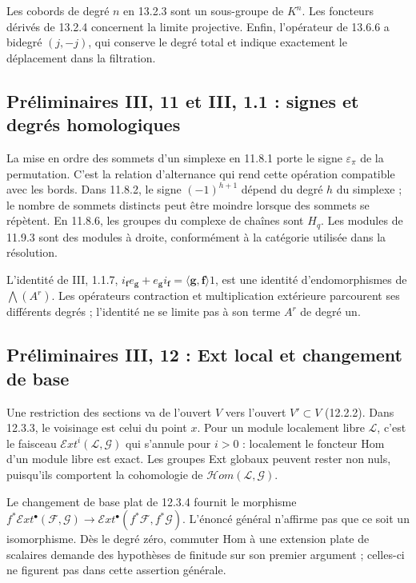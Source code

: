 \documentclass[11pt,a4paper]{article}
\begin{document}
Les cobords de degré $n$ en 13.2.3 sont un sous-groupe de
$K^n$. Les foncteurs dérivés de 13.2.4 concernent la limite
projective. Enfin, l'opérateur de 13.6.6 a bidegré $(j,-j)$,
qui conserve le degré total et indique exactement le déplacement
dans la filtration.

\subsection{Préliminaires III, 11 et III, 1.1 : signes et degrés homologiques}
\label{note:base3-signs}
La mise en ordre des sommets d'un simplexe en 11.8.1 porte le
signe $\varepsilon_\pi$ de la permutation. C'est la relation
d'alternance qui rend cette opération compatible avec les bords.
Dans 11.8.2, le signe $(-1)^{h+1}$ dépend du degré $h$ du
simplexe ; le nombre de sommets distincts peut être moindre
lorsque des sommets se répètent. En 11.8.6, les groupes du
complexe de chaînes sont $H_q$. Les modules de 11.9.3 sont
des modules à droite, conformément à la catégorie utilisée
dans la résolution.

L'identité de III, 1.1.7,
$i_{\mathbf f}e_{\mathbf g}+e_{\mathbf g}i_{\mathbf f}
=\langle\mathbf g,\mathbf f\rangle1$, est une identité
d'endomorphismes de $\bigwedge(A^r)$. Les opérateurs contraction
et multiplication extérieure parcourent ses différents degrés ;
l'identité ne se limite pas à son terme $A^r$ de degré un.

\subsection{Préliminaires III, 12 : Ext local et changement de base}
\label{note:base3-ext}
Une restriction des sections va de l'ouvert $V$ vers l'ouvert
$V'\subset V$ (12.2.2). Dans 12.3.3, le voisinage est celui du
point $x$. Pour un module localement libre $\mathcal L$, c'est
le faisceau $\mathcal E\!xt^i(\mathcal L,\mathcal G)$ qui
s'annule pour $i>0$ : localement le foncteur Hom d'un module
libre est exact. Les groupes Ext globaux peuvent rester non
nuls, puisqu'ils comportent la cohomologie de
$\mathcal H\!om(\mathcal L,\mathcal G)$.

Le changement de base plat de 12.3.4 fournit le morphisme
$f^*\mathcal E\!xt^\bullet(\mathcal F,\mathcal G)
\to\mathcal E\!xt^\bullet(f^*\mathcal F,f^*\mathcal G)$.
L'énoncé général n'affirme pas que ce soit un isomorphisme.
Dès le degré zéro, commuter Hom à une extension plate de
scalaires demande des hypothèses de finitude sur son premier
argument ; celles-ci ne figurent pas dans cette assertion générale.
\end{document}
